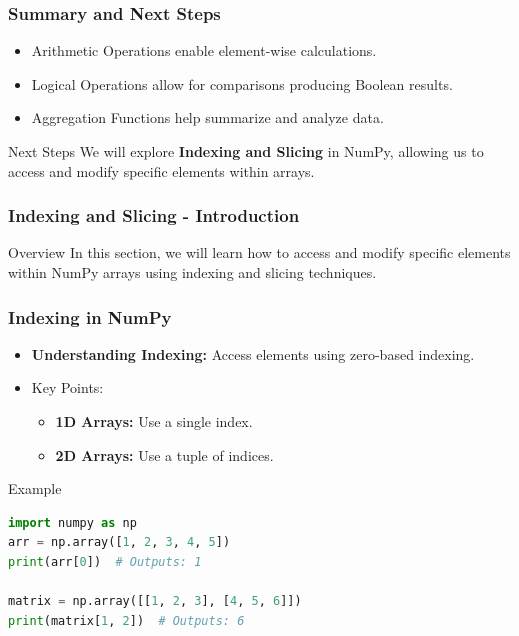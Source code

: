 \documentclass{beamer}
\begin{document}
\begin{frame}
    \frametitle{Summary and Next Steps}
    \begin{itemize}
        \item Arithmetic Operations enable element-wise calculations.
        \item Logical Operations allow for comparisons producing Boolean results.
        \item Aggregation Functions help summarize and analyze data.
    \end{itemize}
    \begin{block}{Next Steps}
        We will explore \textbf{Indexing and Slicing} in NumPy, allowing us to access and modify specific elements within arrays.
    \end{block}
\end{frame}

\begin{frame}[fragile]
    \frametitle{Indexing and Slicing - Introduction}
    \begin{block}{Overview}
        In this section, we will learn how to access and modify specific elements within NumPy arrays using indexing and slicing techniques.
    \end{block}
\end{frame}

\begin{frame}[fragile]
    \frametitle{Indexing in NumPy}
    \begin{itemize}
        \item \textbf{Understanding Indexing:} Access elements using zero-based indexing.
        \item Key Points:
            \begin{itemize}
                \item \textbf{1D Arrays:} Use a single index.
                \item \textbf{2D Arrays:} Use a tuple of indices.
            \end{itemize}
    \end{itemize}
    \begin{block}{Example}
        \begin{lstlisting}[language=Python]
import numpy as np
arr = np.array([1, 2, 3, 4, 5])
print(arr[0])  # Outputs: 1

matrix = np.array([[1, 2, 3], [4, 5, 6]])
print(matrix[1, 2])  # Outputs: 6
        \end{lstlisting}
    \end{block}
\end{frame}
\end{document}
